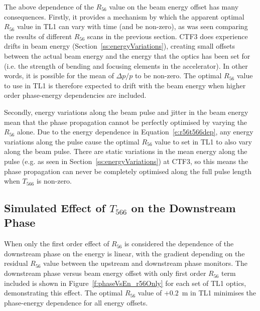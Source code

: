 The above dependence of the \(R_{56}\) value on the beam energy offset has many consequences. Firstly, it provides a mechanism by which the apparent optimal \(R_{56}\) value in TL1 can vary with time (and be non-zero), as was seen comparing the results of different \(R_{56}\) scans in the previous section. CTF3 does experience drifts in beam energy (Section~\ref{ss:energyVariations}), creating small offsets between the actual beam energy and the energy that the optics has been set for (i.e. the strength of bending and focusing elements in the accelerator). In other words, it is possible for the mean of \(\Delta p / p\) to be non-zero. The optimal \(R_{56}\) value to use in TL1 is therefore expected to drift with the beam energy when higher order phase-energy dependencies are included.

Secondly, energy variations along the beam pulse and jitter in the beam energy mean that the phase propagation cannot be perfectly optimised by varying the \(R_{56}\) alone. Due to the energy dependence in Equation~\ref{e:r56t566dep}, any energy variations along the pulse cause the optimal \(R_{56}\) value to set in TL1 to also vary along the beam pulse. There are static variations in the mean energy along the pulse (e.g. as seen in Section~\ref{ss:energyVariations}) at CTF3, so this means the phase propagation can never be completely optimised along the full pulse length when \(T_{566}\) is non-zero. 

\subsection{Simulated Effect of \(T_{566}\) on the Downstream Phase}
\label{ss:t566Sim}

When only the first order effect of \(R_{56}\) is considered the dependence of the downstream phase on the energy is linear, with the gradient depending on the residual \(R_{56}\) value between the upstream and downstream phase monitors. The downstream phase versus beam energy offset with only first order \(R_{56}\) term included is shown in Figure~\ref{f:phaseVsEn_r56Only} for each set of TL1 optics, demonstrating this effect. The optimal \(R_{56}\) value of \(+0.2\)~m in TL1 minimises the phase-energy dependence for all energy offsets.

